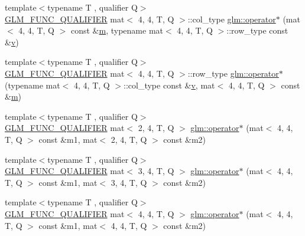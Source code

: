\begin{DoxyCompactItemize}
\item 
{\footnotesize template$<$typename T , qualifier Q$>$ }\\\mbox{\hyperlink{setup_8hpp_a33fdea6f91c5f834105f7415e2a64407}{G\+L\+M\+\_\+\+F\+U\+N\+C\+\_\+\+Q\+U\+A\+L\+I\+F\+I\+ER}} mat$<$ 4, 4, T, Q $>$\+::col\+\_\+type \mbox{\hyperlink{namespaceglm_a06757e039fd5931572ab128492a78b49}{glm\+::operator$\ast$}} (mat$<$ 4, 4, T, Q $>$ const \&\mbox{\hyperlink{_s_d_l__opengl__glext_8h_af593500c283bf1a787a6f947f503a5c2}{m}}, typename mat$<$ 4, 4, T, Q $>$\+::row\+\_\+type const \&\mbox{\hyperlink{_s_d_l__opengl_8h_a10a82eabcb59d2fcd74acee063775f90}{v}})
\item 
{\footnotesize template$<$typename T , qualifier Q$>$ }\\\mbox{\hyperlink{setup_8hpp_a33fdea6f91c5f834105f7415e2a64407}{G\+L\+M\+\_\+\+F\+U\+N\+C\+\_\+\+Q\+U\+A\+L\+I\+F\+I\+ER}} mat$<$ 4, 4, T, Q $>$\+::row\+\_\+type \mbox{\hyperlink{namespaceglm_ad1596a8d5b5d11322c0f70288f5b4dce}{glm\+::operator$\ast$}} (typename mat$<$ 4, 4, T, Q $>$\+::col\+\_\+type const \&\mbox{\hyperlink{_s_d_l__opengl_8h_a10a82eabcb59d2fcd74acee063775f90}{v}}, mat$<$ 4, 4, T, Q $>$ const \&\mbox{\hyperlink{_s_d_l__opengl__glext_8h_af593500c283bf1a787a6f947f503a5c2}{m}})
\item 
{\footnotesize template$<$typename T , qualifier Q$>$ }\\\mbox{\hyperlink{setup_8hpp_a33fdea6f91c5f834105f7415e2a64407}{G\+L\+M\+\_\+\+F\+U\+N\+C\+\_\+\+Q\+U\+A\+L\+I\+F\+I\+ER}} mat$<$ 2, 4, T, Q $>$ \mbox{\hyperlink{namespaceglm_a7b1b919046008866e15bf2ec344cdc90}{glm\+::operator$\ast$}} (mat$<$ 4, 4, T, Q $>$ const \&m1, mat$<$ 2, 4, T, Q $>$ const \&m2)
\item 
{\footnotesize template$<$typename T , qualifier Q$>$ }\\\mbox{\hyperlink{setup_8hpp_a33fdea6f91c5f834105f7415e2a64407}{G\+L\+M\+\_\+\+F\+U\+N\+C\+\_\+\+Q\+U\+A\+L\+I\+F\+I\+ER}} mat$<$ 3, 4, T, Q $>$ \mbox{\hyperlink{namespaceglm_a840e2309b365871aecc173381ca3b770}{glm\+::operator$\ast$}} (mat$<$ 4, 4, T, Q $>$ const \&m1, mat$<$ 3, 4, T, Q $>$ const \&m2)
\item 
{\footnotesize template$<$typename T , qualifier Q$>$ }\\\mbox{\hyperlink{setup_8hpp_a33fdea6f91c5f834105f7415e2a64407}{G\+L\+M\+\_\+\+F\+U\+N\+C\+\_\+\+Q\+U\+A\+L\+I\+F\+I\+ER}} mat$<$ 4, 4, T, Q $>$ \mbox{\hyperlink{namespaceglm_ad8f4287ee1fb03675fd3d6040078586d}{glm\+::operator$\ast$}} (mat$<$ 4, 4, T, Q $>$ const \&m1, mat$<$ 4, 4, T, Q $>$ const \&m2)

\end{DoxyCompactItemize}
